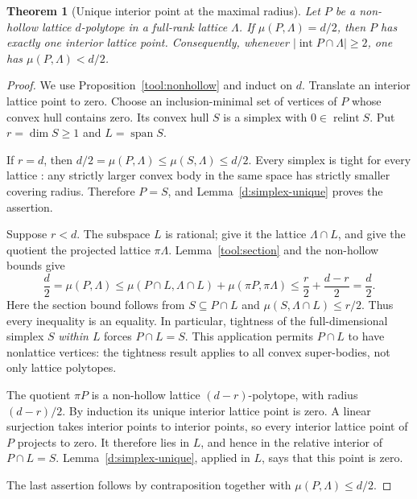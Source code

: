 \documentclass[11pt,a4paper]{article}
\newtheorem{theorem}{Theorem}[section]
\theoremstyle{remark}\newtheorem{remark}[theorem]{Remark}
\DeclareMathOperator{\inter}{int}
\begin{document}
\begin{theorem}[Unique interior point at the maximal radius]\label{d:global-unique}
Let $P$ be a non-hollow lattice $d$-polytope in a full-rank lattice
$\Lambda$. If $\mu(P,\Lambda)=d/2$, then $P$ has exactly one
interior lattice point. Consequently, whenever
$|\inter P\cap\Lambda|\ge2$, one has $\mu(P,\Lambda)<d/2$.
\end{theorem}
\begin{proof}
We use Proposition~\ref{tool:nonhollow} and induct on $d$.
Translate an interior lattice point to zero. Choose an
inclusion-minimal set of vertices of $P$ whose convex hull contains
zero. Its convex hull $S$ is a simplex with $0\in\operatorname{relint}S$.
Put $r=\dim S\ge1$ and $L=\operatorname{span}S$.

If $r=d$, then
$d/2=\mu(P,\Lambda)\le\mu(S,\Lambda)\le d/2$.
Every simplex is tight for every lattice
\cite[Lemma~2.7]{CSS}: any strictly larger convex body in the same
space has strictly smaller covering radius. Therefore $P=S$,
and Lemma~\ref{d:simplex-unique} proves the assertion.

Suppose $r<d$. The subspace $L$ is rational; give it the lattice
$\Lambda\cap L$, and give the quotient the projected lattice
$\pi\Lambda$. Lemma~\ref{tool:section} and the non-hollow bounds give
\[
 \frac d2=\mu(P,\Lambda)
 \le\mu(P\cap L,\Lambda\cap L)+\mu(\pi P,\pi\Lambda)
 \le\frac r2+\frac{d-r}{2}=\frac d2.
\]
Here the section bound follows from $S\subseteq P\cap L$ and
$\mu(S,\Lambda\cap L)\le r/2$. Thus every inequality is an equality.
In particular, tightness of the full-dimensional simplex $S$
\emph{within $L$} forces $P\cap L=S$. This application permits
$P\cap L$ to have nonlattice vertices: the tightness result applies
to all convex super-bodies, not only lattice polytopes.

The quotient $\pi P$ is a non-hollow lattice $(d-r)$-polytope,
with radius $(d-r)/2$. By induction its unique interior lattice
point is zero. A linear surjection takes interior points to
interior points, so every interior lattice point of $P$ projects
to zero. It therefore lies in $L$, and hence in the relative
interior of $P\cap L=S$. Lemma~\ref{d:simplex-unique}, applied in
$L$, says that this point is zero.

The last assertion follows by contraposition together with
$\mu(P,\Lambda)\le d/2$.
\end{proof}
\end{document}
